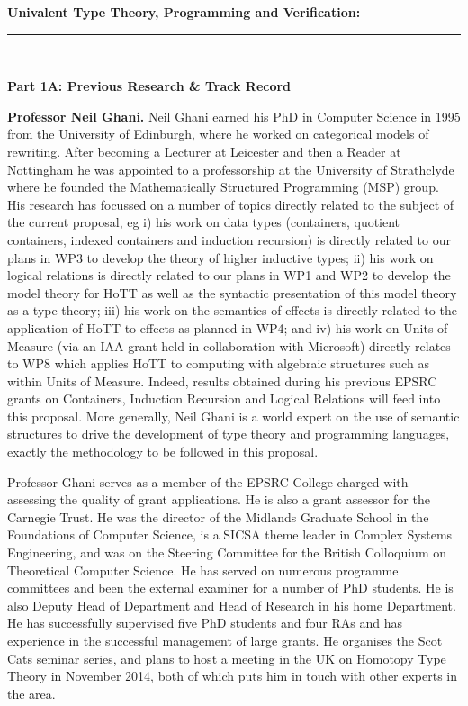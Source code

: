 \documentclass[a4paper,11pt]{article}
\begin{document}
\thispagestyle{plain}
\begin{center}
  {\Large {\bf Univalent Type Theory, Programming and Verification:}}\\[1ex] 

\vspace*{-0.1in}

  \rule{140mm}{.5mm}\\[2ex]
\end{center}

\noindent
{\bf \Large Part 1A: Previous Research \& Track Record}

\textbf{Professor Neil Ghani.} Neil Ghani earned his PhD in Computer
Science in 1995 from the University of Edinburgh, where he worked on
categorical models of rewriting.  After becoming a Lecturer at
Leicester and then a Reader at Nottingham he was appointed to a
professorship at the University of Strathclyde where he founded the
Mathematically Structured Programming (MSP) group. His research has
focussed on a number of topics directly related to the subject of the
current proposal, eg i) his work on data types (containers, quotient
containers, indexed containers and induction recursion) is directly
related to our plans in WP3 to develop the theory of higher inductive
types; ii) his work on logical relations is directly related to our
plans in WP1 and WP2 to develop the model theory for HoTT as well as
the syntactic presentation of this model theory as a type theory; iii)
his work on the semantics of effects is directly related to the
application of HoTT to effects as planned in WP4; and iv) his work on
Units of Measure (via an IAA grant held in collaboration with
Microsoft) directly relates to WP8 which applies HoTT to computing
with algebraic structures such as within Units of Measure. Indeed,
results obtained during his previous EPSRC grants on Containers,
Induction Recursion and Logical Relations will feed into this
proposal.  More generally, Neil Ghani is a world expert on the use of
semantic structures to drive the development of type theory and
programming languages, exactly the methodology to be followed in this
proposal.

Professor Ghani serves as a member of the EPSRC College charged with
assessing the quality of grant applications. He is also a grant
assessor for the Carnegie Trust.  He was the director of the Midlands
Graduate School in the Foundations of Computer Science, is a SICSA
theme leader in Complex Systems Engineering, and was on the Steering
Committee for the British Colloquium on Theoretical Computer Science.
He has served on numerous programme committees and been the external
examiner for a number of PhD students. He is also Deputy Head of
Department and Head of Research in his home Department. He has
successfully supervised five PhD students and four RAs and has
experience in the successful management of large grants. He organises
the Scot Cats seminar series, and plans to host a meeting in the UK on
Homotopy Type Theory in November 2014, both of which puts him in touch
with other experts in the area.
\end{document}
